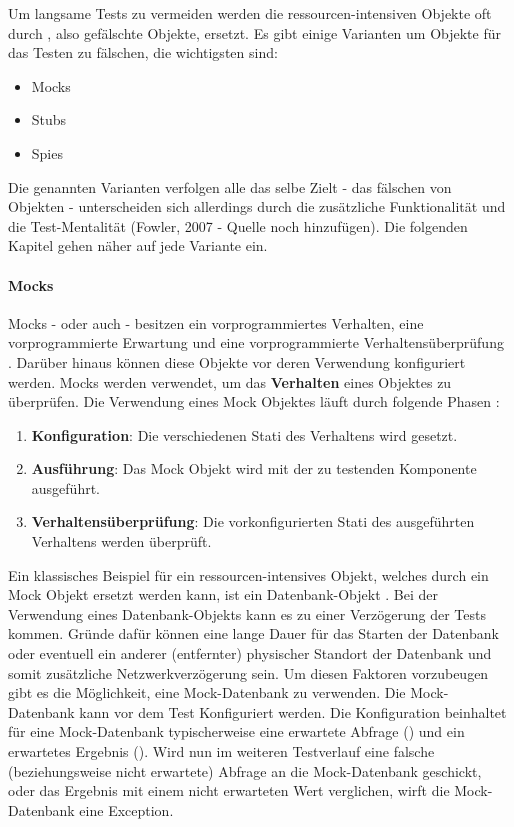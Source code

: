 Um langsame Tests zu vermeiden werden die ressourcen-intensiven Objekte oft durch , also gefälschte Objekte, ersetzt. Es gibt einige Varianten um Objekte für das Testen zu fälschen, die wichtigsten sind:

\begin{itemize}
  \item Mocks
  \item Stubs
  \item Spies
\end{itemize}

Die genannten Varianten verfolgen alle das selbe Zielt - das fälschen von Objekten - unterscheiden sich allerdings durch die zusätzliche Funktionalität und die Test-Mentalität (Fowler, 2007 - Quelle noch hinzufügen). Die folgenden Kapitel gehen näher auf jede Variante ein.

\paragraph{Mocks}
Mocks - oder auch  - besitzen ein vorprogrammiertes Verhalten, eine vorprogrammierte Erwartung und eine vorprogrammierte Verhaltensüberprüfung \autocite[453]{Johansen:2011}. Darüber hinaus können diese Objekte vor deren Verwendung konfiguriert werden. Mocks werden verwendet, um das \textbf{Verhalten} eines Objektes zu überprüfen. Die Verwendung eines Mock Objektes läuft durch folgende Phasen \autocite[453]{Johansen:2011}:
\begin{enumerate}
  \item \textbf{Konfiguration}: \newline
  Die verschiedenen Stati des Verhaltens wird gesetzt.
  \item \textbf{Ausführung}: \newline
  Das Mock Objekt wird mit der zu testenden Komponente ausgeführt.
  \item \textbf{Verhaltensüberprüfung}: \newline
  Die vorkonfigurierten Stati des ausgeführten Verhaltens werden überprüft.
\end{enumerate}

Ein klassisches Beispiel für ein ressourcen-intensives Objekt, welches durch ein Mock Objekt ersetzt werden kann, ist ein Datenbank-Objekt \autocite[144]{Beck:2003}. Bei der Verwendung eines Datenbank-Objekts kann es zu einer Verzögerung der Tests kommen. Gründe dafür können eine lange Dauer für das Starten der Datenbank oder eventuell ein anderer (entfernter) physischer Standort der Datenbank und somit zusätzliche Netzwerkverzögerung sein. Um diesen Faktoren vorzubeugen gibt es die Möglichkeit, eine Mock-Datenbank zu verwenden. Die Mock-Datenbank kann vor dem Test Konfiguriert werden. Die Konfiguration beinhaltet für eine Mock-Datenbank typischerweise eine erwartete Abfrage () und ein erwartetes Ergebnis (). Wird nun im weiteren Testverlauf eine falsche (beziehungsweise nicht erwartete) Abfrage an die Mock-Datenbank geschickt, oder das Ergebnis mit einem nicht erwarteten Wert verglichen, wirft die Mock-Datenbank eine Exception.

